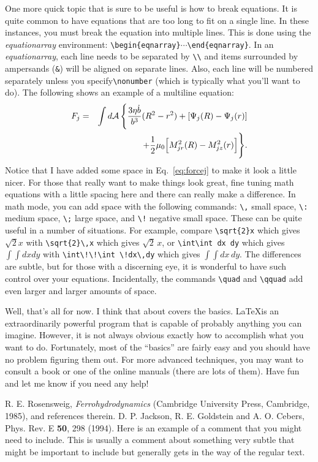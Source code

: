 \documentclass[preprint,pre,floats,aps,amsmath,amssymb]{revtex4}
\begin{document}
One more quick topic that is sure to be useful is how to break equations. It is quite common to have equations that are too long to fit on a single line. In these instances, you must break the equation into multiple lines. This is done using the \textit{equationarray} environment: \verb!\begin{eqnarray}!$\cdots$\verb!\end{eqnarray}!. In an \textit{equationarray}, each line needs to be separated by \verb!\\! and items surrounded by ampersands (\verb!&!) will be aligned on separate lines. Also, each line will be numbered separately unless you specify\verb!\nonumber! (which is typically what you'll want to do). The following shows an example of a multiline equation:
\begin{eqnarray}
F_{j} &=& \int d {\cal A}\, \Biggl\{ \frac{3\eta \dot{b}}{b^3}
(R^2 - r^2) + [\Psi_j(R) - \Psi_j(r)] \nonumber \\
&\ &\qquad\qquad + \frac{1}{2}\mu_0 \Bigl[ M_{jr}^2(R) -
M_{jz}^2(r) \Bigr] \Biggr\}.
\label{eq:forcej}
\end{eqnarray}
Notice that I have added some space in Eq.~\ref{eq:forcej} to make it look a little nicer. For those that really want to make things look great, fine tuning math equations with a little spacing here and there can really make a difference. In math mode, you can add space with the following commands: \verb!\,! small space, \verb!\:! medium space, \verb!\;! large space, and \verb&\!& negative small space. These can be quite useful in a number of situations. For example, compare \verb!\sqrt{2}x! which gives $\sqrt{2}x$ with \verb!\sqrt{2}\,x! which gives $\sqrt{2}\,x$, or \verb!\int\int dx dy! which gives $\int\int dx dy$ with \verb&\int\!\!\int \!dx\,dy& which gives $\int\!\!\int \!dx\,dy$. The differences are subtle, but for those with a discerning eye, it is wonderful to have such control over your equations. Incidentally, the commands \verb!\quad! and \verb!\qquad! add even larger and larger amounts of space.

Well, that's all for now. I think that about covers the basics. \LaTeX is an extraordinarily powerful program that is capable of probably anything you can imagine. However, it is not always obvious exactly how to accomplish what you want to do. Fortunately, most of the ``basics'' are fairly easy and you should have no problem figuring them out. For more advanced techniques, you may want to consult a book or one of the online manuals (there are lots of them). Have fun and let me know if you need any help!

\begin{thebibliography}{99}
R. E. Rosensweig, {\it Ferrohydrodynamics} (Cambridge University Press, Cambridge, 1985), and references therein.
D. P. Jackson, R. E. Goldstein and A. O. Cebers, Phys. Rev. E {\bf 50}, 298 (1994).
 Here is an example of a comment that you might need to include. This is usually a comment about something very subtle that might be important to include but generally gets in the way of the regular text.
\end{thebibliography}
\end{document}
